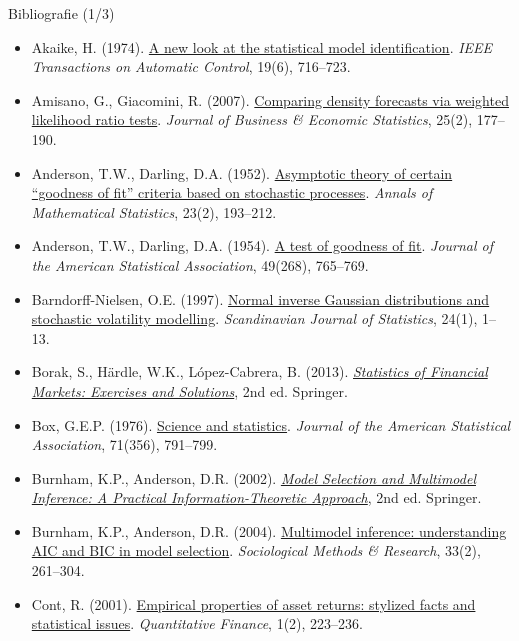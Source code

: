 \begin{frame}{Bibliografie (1/3)}
\itemsize{\tiny}
\begin{itemize}
    \item Akaike, H. (1974). \href{https://doi.org/10.1109/TAC.1974.1100705}{A new look at the statistical model identification}. \textit{IEEE Transactions on Automatic Control}, 19(6), 716--723.
    \item Amisano, G., Giacomini, R. (2007). \href{https://doi.org/10.1198/073500106000000332}{Comparing density forecasts via weighted likelihood ratio tests}. \textit{Journal of Business \& Economic Statistics}, 25(2), 177--190.
    \item Anderson, T.W., Darling, D.A. (1952). \href{https://doi.org/10.1214/aoms/1177729437}{Asymptotic theory of certain ``goodness of fit'' criteria based on stochastic processes}. \textit{Annals of Mathematical Statistics}, 23(2), 193--212.
    \item Anderson, T.W., Darling, D.A. (1954). \href{https://doi.org/10.1080/01621459.1954.10501232}{A test of goodness of fit}. \textit{Journal of the American Statistical Association}, 49(268), 765--769.
    \item Barndorff-Nielsen, O.E. (1997). \href{https://doi.org/10.1111/1467-9469.00045}{Normal inverse Gaussian distributions and stochastic volatility modelling}. \textit{Scandinavian Journal of Statistics}, 24(1), 1--13.
    \item Borak, S., Härdle, W.K., López-Cabrera, B. (2013). \href{https://doi.org/10.1007/978-3-642-33929-5}{\textit{Statistics of Financial Markets: Exercises and Solutions}}, 2nd ed. Springer.
    \item Box, G.E.P. (1976). \href{https://doi.org/10.1080/01621459.1976.10480949}{Science and statistics}. \textit{Journal of the American Statistical Association}, 71(356), 791--799.
    \item Burnham, K.P., Anderson, D.R. (2002). \href{https://doi.org/10.1007/b97636}{\textit{Model Selection and Multimodel Inference: A Practical Information-Theoretic Approach}}, 2nd ed. Springer.
    \item Burnham, K.P., Anderson, D.R. (2004). \href{https://doi.org/10.1177/0049124104268644}{Multimodel inference: understanding AIC and BIC in model selection}. \textit{Sociological Methods \& Research}, 33(2), 261--304.
    \item Cont, R. (2001). \href{https://doi.org/10.1080/713665670}{Empirical properties of asset returns: stylized facts and statistical issues}. \textit{Quantitative Finance}, 1(2), 223--236.

\end{itemize}
\end{frame}
